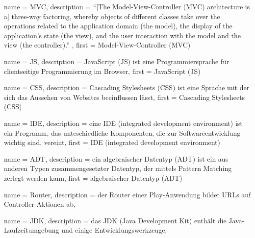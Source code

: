 






{
  name        = MVC,
  description = {"`[The Model-View-Controller (MVC) architecture is a] three-way factoring, whereby objects of different classes take over the operations related to the application domain (the model), the display of the application's state (the view), and the user interaction with the model and the view (the controller)."' \cite[vgl.][S.~1]{mvc}},
  first       = {Model-View-Controller (MVC)}
}


{
  name        = JS,
  description = {JavaScript (JS) ist eine Programmiersprache für clientseitige Programmierung im Browser},
  first       = {JavaScript (JS)}
}


{
  name        = CSS,
  description = {Cascading Stylesheets (CSS) ist eine Sprache mit der sich das Aussehen von Websites beeinflussen lässt},
  first       = {Cascading Stylesheets (CSS)}
}


{
  name        = IDE,
  description = {eine IDE (integrated development environment) ist ein Programm, das unteschiedliche Komponenten, die zur Softwareentwicklung wichtig sind, vereint},
  first       = {IDE (integrated development environment)}
}


{
  name        = ADT,
  description = {ein algebraischer Datentyp (ADT) ist ein aus anderen Typen zusammengesetzter Datentyp, der mittels Pattern Matching zerlegt werden kann},
  first       = {algebraischer Datentyp (ADT)}
}


{
  name        = Router,
  description = {der Router einer Play-Anwendung bildet URLs auf Controller-Aktionen ab},
}


{
  name        = JDK,
  description = {das JDK (Java Development Kit) enthält die Java-Laufzeitumgebung und einige Entwicklungswerkzeuge},
}